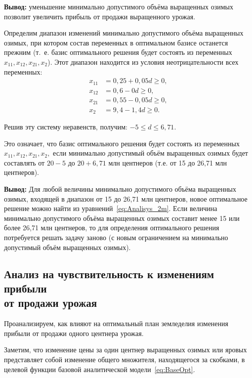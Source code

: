 \textbf{Вывод:} уменьшение минимально допустимого объёма выращенных озимых
позволит увеличить прибыль от продажи выращенного урожая.


Определим диапазон изменений минимально допустимого объёма выращенных озимых, при котором состав
переменных в оптимальном базисе останется прежним (т.~е. базис оптимального решения будет состоять из переменных
$ x_{11}, x_{12}, x_{21}, x_{2} $). Этот диапазон находится из условия неотрицательности всех переменных:
\begin{equation}
    \begin{aligned}
      x_{11} &= 0{,}25 + 0{,}05d \ge 0, \\
      x_{12} &= 0{,}6 - 0d \ge 0, \\
      x_{21} &= 0{,}55 - 0{,}05d \ge 0, \\
      x_{2} &= 9{,}4 - 1{,}4d \ge 0.
    \end{aligned}
\end{equation}

Решив эту систему неравенств, получим: $ -5 \le d \le 6{,}71 $.

Это означает, что базис оптимального решения будет состоять из переменных 
$ x_{11}, x_{12}, x_{21}, x_{2}, $ если минимально допустимый объём выращенных озимых
будет составлять от $ 20 - 5 $ до $ 20 + 6{,}71 $ млн центнеров
(т.е. от 15 до 26{,}71 млн центнеров).

\textbf{Вывод:}
Для любой величины минимально допустимого объёма выращенных озимых,
входящей в диапазон от 15 до 26{,}71 млн центнеров, новое оптимальное решение можно найти
из уравнений~\eqref{eq:Analisys_2m}.
Если величина минимально допустимого объёма выращенных озимых
составит менее 15 или более 26{,}71 млн центнеров, то для
определения оптимального решения потребуется решать задачу заново (с
новым ограничением на минимально допустимый объём выращенных озимых).


\subsection{Анализ на чувствительность к изменениям 
  прибыли \\ от продажи урожая}

Проанализируем, как влияют на оптимальный план земледелия изменения прибыли от
продажи одного центнера урожая.

Заметим, что изменение цены за один центнер выращенных озимых или яровых
представляет собой изменение общего множителя, находящегося за скобками,
в целевой функции базовой аналитической модели~\eqref{eq:BaseOpt}.

